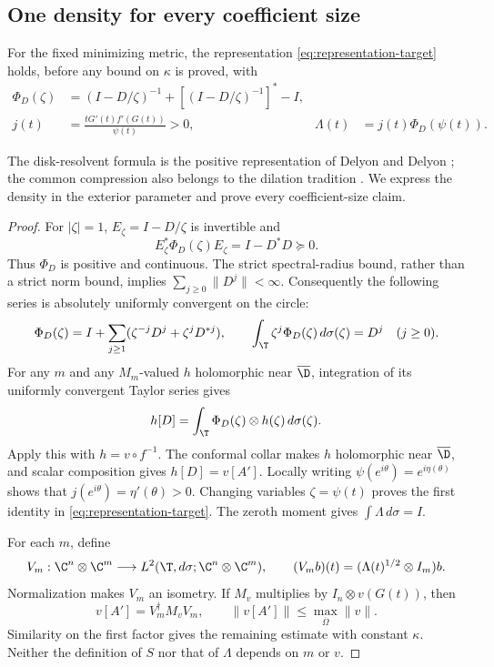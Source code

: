 \subsection{One density for every coefficient size}
\begin{proposition}\label{prop:density}
For the fixed minimizing metric, the representation
\eqref{eq:representation-target} holds, before any bound on $\kappa$ is
proved, with
\begin{align}
 \Phi_D(\zeta)&=(I-D/\zeta)^{-1}+[(I-D/\zeta)^{-1}]^*-I,
                                                        \label{eq:phi}\\
 j(t)&=\frac{tG'(t)f'(G(t))}{\psi(t)}>0,
 &\Lambda(t)&=j(t)\Phi_D(\psi(t)).                      \label{eq:lambda}
\end{align}
\end{proposition}
The disk-resolvent formula is the positive representation of
Delyon and Delyon \cite[Section 2, equation (7)]{DelyonDelyon1999};
the common compression also belongs to the dilation tradition
\cite[Theorem I]{SzNagy1953}. We express the density in the exterior
parameter and prove every coefficient-size claim.
\begin{proof}
For $|\zeta|=1$, $E_\zeta=I-D/\zeta$ is invertible and
\[
 E_\zeta^*\Phi_D(\zeta)E_\zeta=I-D^*D\succeq0.
\]
Thus $\Phi_D$ is positive and continuous. The strict spectral-radius
bound, rather than a strict norm bound, implies $\sum_{j\ge0}\|D^j\|<\infty$.
Consequently the following series is absolutely uniformly convergent on
the circle:
\[
 \Phi_D(\zeta)=I+\sum_{j\ge1}(\zeta^{-j}D^j+\zeta^jD^{*j}),
 \qquad \int_\T\zeta^j\Phi_D(\zeta)\,d\sigma(\zeta)=D^j
 \quad(j\ge0).
\]
For any $m$ and any $M_m$-valued $h$ holomorphic near $\overline\D$,
integration of its uniformly convergent Taylor series gives
\[
 h[D]=\int_\T\Phi_D(\zeta)\otimes h(\zeta)\,d\sigma(\zeta).
\]
Apply this with $h=v\circ f^{-1}$. The conformal collar makes $h$
holomorphic near $\overline\D$, and scalar composition gives $h[D]=v[A']$.
Locally writing $\psi(e^{i\theta})=e^{i\eta(\theta)}$ shows that
$j(e^{i\theta})=\eta'(\theta)>0$. Changing variables
$\zeta=\psi(t)$ proves the first identity in
\eqref{eq:representation-target}. The zeroth moment gives
$\int\Lambda\,d\sigma=I$.

For each $m$, define
\[
 V_m:\C^n\otimes\C^m\longrightarrow
 L^2(\T,d\sigma;\C^n\otimes\C^m),\qquad
 (V_m b)(t)=(\Lambda(t)^{1/2}\otimes I_m)b.
\]
Normalization makes $V_m$ an isometry. If $M_v$ multiplies by
$I_n\otimes v(G(t))$, then
\[
 v[A']=V_m^\dagger M_vV_m,\qquad
 \|v[A']\|\le\max_{\overline\Omega}\|v\|.
\]
Similarity on the first factor gives the remaining estimate with constant
$\kappa$. Neither the definition of $S$ nor that of $\Lambda$ depends
on $m$ or $v$.
\end{proof}

